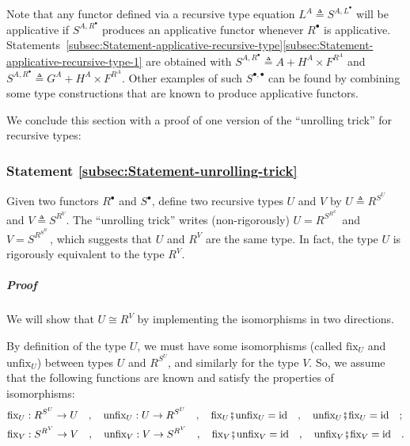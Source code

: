 Note that any functor defined via a recursive type equation $L^{A}\triangleq S^{A,L^{\bullet}}$
will be applicative if $S^{A,R^{\bullet}}$ produces an applicative
functor whenever $R^{\bullet}$ is applicative. Statements~\ref{subsec:Statement-applicative-recursive-type}\textendash \ref{subsec:Statement-applicative-recursive-type-1}
are obtained with $S^{A,R^{\bullet}}\triangleq A+H^{A}\times F^{R^{A}}$
and $S^{A,R^{\bullet}}\triangleq G^{A}+H^{A}\times F^{R^{A}}$. Other
examples of such $S^{\bullet,\bullet}$ can be found by combining
some type constructions that are known to produce applicative functors.

We conclude this section with a proof of one version of the \textsf{``}unrolling
trick\textsf{''} for recursive types:

\subsubsection{Statement \label{subsec:Statement-unrolling-trick}\ref{subsec:Statement-unrolling-trick}}

Given two functors $R^{\bullet}$ and $S^{\bullet}$, define two recursive
types $U$ and $V$ by $U\triangleq R^{S^{U}}$ and $V\triangleq S^{R^{V}}$.
The \textsf{``}unrolling trick\textsf{''} writes (non-rigorously) $U=R^{S^{R^{S^{\iddots}}}}\!$
and $V=S^{R^{S^{R^{\iddots}}}}\!$, which suggests that $U$ and $R^{V}$
are the same type. In fact, the type $U$ is rigorously equivalent
to the type $R^{V}$.

\subparagraph{Proof}

We will show that $U\cong R^{V}$ by implementing the isomorphisms
in two directions. 

By definition of the type $U$, we must have some isomorphisms (called
$\text{fix}_{U}$ and $\text{unfix}_{U}$) between types $U$ and
$R^{S^{U}}$, and similarly for the type $V$. So, we assume that
the following functions are known and satisfy the properties of isomorphisms:
\begin{align*}
 & \text{fix}_{U}:R^{S^{U}}\rightarrow U\quad,\quad\text{unfix}_{U}:U\rightarrow R^{S^{U}}\quad,\quad\text{fix}_{U}\bef\text{unfix}_{U}=\text{id}\quad,\quad\text{unfix}_{U}\bef\text{fix}_{U}=\text{id}\quad;\\
 & \text{fix}_{V}:S^{R^{V}}\rightarrow V\quad,\quad\text{unfix}_{V}:V\rightarrow S^{R^{V}}\quad,\quad\text{fix}_{V}\bef\text{unfix}_{V}=\text{id}\quad,\quad\text{unfix}_{V}\bef\text{fix}_{V}=\text{id}\quad.
\end{align*}

